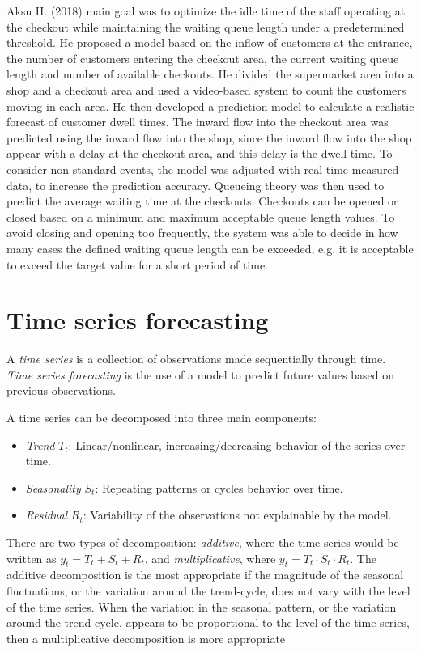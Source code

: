 Aksu H. (2018) \cite{aksu} main goal was to optimize the idle time of the staff operating at the checkout while maintaining the waiting queue length under a predetermined threshold. He proposed a model based on the inflow of customers at
the entrance, the number of customers entering the checkout area, the current waiting
queue length and number of available checkouts. He divided the supermarket area into a shop and a checkout area and used a video-based system to count the customers moving in each area. He then developed a prediction model to calculate a realistic forecast of customer dwell times. The inward flow into the checkout area was predicted using the inward flow into the shop, since the inward flow into the shop appear with a delay at the checkout area, and this delay is the dwell time. To consider non-standard events, the model was adjusted with real-time measured data, to increase the prediction accuracy. Queueing theory was then used to predict the average waiting time at the checkouts. Checkouts can be opened or closed based on a minimum and maximum acceptable queue length values. To avoid closing and opening too frequently, the system was able to decide in how many cases the defined waiting queue length can be exceeded, e.g. it is acceptable to exceed the target value for a short period of time.

\section{Time series forecasting}
\label{sec:time_series_forecasting}

A \emph{time series} is a collection of observations made sequentially through time. \emph{Time series forecasting} is the use of a model to predict future values based on previous observations.

A time series can be decomposed into three main components:
\begin{itemize}
  \item \emph{Trend} \( T_t \): Linear/nonlinear, increasing/decreasing behavior of the series over time.
  \item \emph{Seasonality} \( S_t \): Repeating patterns or cycles behavior over time.
  \item \emph{Residual} \( R_t \): Variability of the observations not explainable by the model.
\end{itemize}

There are two types of decomposition: \emph{additive}, where the time series would be written as \( y_t = T_t + S_t + R_t \), and \emph{multiplicative}, where \( y_t = T_t \cdot S_t \cdot R_t \).
The additive decomposition is the most appropriate if the magnitude of the seasonal fluctuations, or the variation around the trend-cycle, does not vary with the level of the time series. When the variation in the seasonal pattern, or the variation around the trend-cycle, appears to be proportional to the level of the time series, then a multiplicative decomposition is more appropriate

